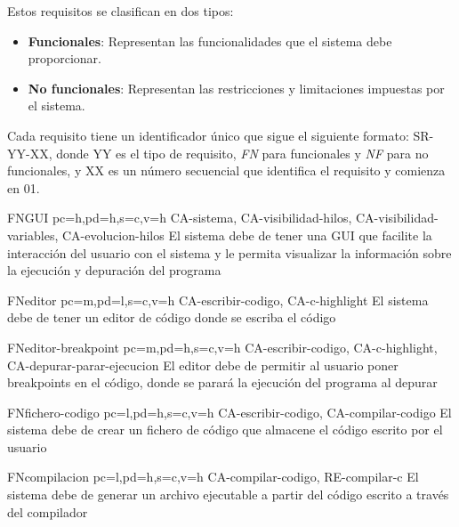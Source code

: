 Estos requisitos se clasifican en dos tipos:
\begin{itemize}
    \item \textbf{Funcionales}: Representan las funcionalidades que el sistema debe proporcionar.
    \item \textbf{No funcionales}: Representan las restricciones y limitaciones impuestas por el sistema.
\end{itemize}

Cada requisito tiene un identificador único que sigue el siguiente formato: SR-YY-XX, donde YY es el tipo de requisito, \textit{FN} para funcionales y \textit{NF} para no funcionales, y XX es un número secuencial que identifica el requisito y comienza en 01.

\printsreqtemplate

\begin{softwareReq}{FN}{GUI}
    {pc=h,pd=h,s=c,v=h}
    {CA-sistema, CA-visibilidad-hilos, CA-visibilidad-variables, CA-evolucion-hilos}
    El sistema debe de tener una \gls{GUI} que facilite la interacción del usuario con el sistema y le permita visualizar la información sobre la ejecución y depuración del programa
\end{softwareReq}

\begin{softwareReq}{FN}{editor}
    {pc=m,pd=l,s=c,v=h}
    {CA-escribir-codigo, CA-c-highlight}
    El sistema debe de tener un editor de código donde se escriba el código
\end{softwareReq}

\begin{softwareReq}{FN}{editor-breakpoint}
    {pc=m,pd=h,s=c,v=h}
    {CA-escribir-codigo, CA-c-highlight, CA-depurar-parar-ejecucion}
    El editor debe de permitir al usuario poner \glspl{breakpoint} en el código, donde se parará la ejecución del programa al depurar
\end{softwareReq}

\begin{softwareReq}{FN}{fichero-codigo}
    {pc=l,pd=h,s=c,v=h}
    {CA-escribir-codigo, CA-compilar-codigo}
    El sistema debe de crear un fichero de código que almacene el código escrito por el usuario
\end{softwareReq}

\begin{softwareReq}{FN}{compilacion}
    {pc=l,pd=h,s=c,v=h}
    {CA-compilar-codigo, RE-compilar-c}
    El sistema debe de generar un archivo ejecutable a partir del código escrito a través del \gls{compilador}
\end{softwareReq}

